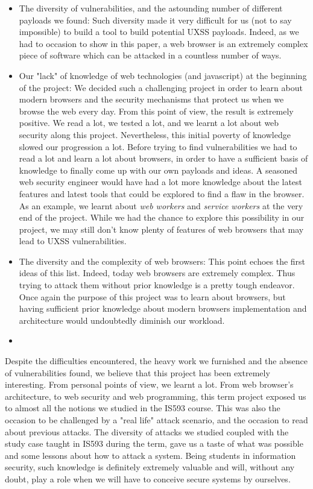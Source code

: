 \documentclass[journal]{IEEEtran}
\begin{document}
\begin{itemize}
\item The diversity of vulnerabilities, and the astounding number of different payloads we found: Such diversity made it very difficult for us (not to say impossible) to build a tool to build potential UXSS payloads. Indeed, as we had to occasion to show in this paper, a web browser is an extremely complex piece of software which can be attacked in a countless number of ways.
\item Our "lack" of knowledge of web technologies (and javascript) at the beginning of the project: We decided such a challenging project in order to learn about modern browsers and the security mechanisms that protect us when we browse the web every day. From this point of view, the result is extremely positive. We read a lot, we tested a lot, and we learnt a lot about web security along this project. Nevertheless, this initial poverty of knowledge slowed our progression a lot. Before trying to find vulnerabilities we had to read a lot and learn a lot about browsers, in order to have a sufficient basis of knowledge to finally come up with our own payloads and ideas. A seasoned web security engineer would have had a lot more knowledge about the latest features and latest tools that could be explored to find a flaw in the browser. As an example, we learnt about \emph{web workers} and \emph{service workers} at the very end of the project. While we had the chance to explore this possibility in our project, we may still don't know plenty of features of web browsers that may lead to UXSS vulnerabilities.
\item The diversity and the complexity of web browsers: This point echoes the first ideas of this list. Indeed, today web browsers are extremely complex. Thus trying to attack them without prior knowledge is a pretty tough endeavor. Once again the purpose of this project was to learn about browsers, but having sufficient prior knowledge about modern browsers implementation and architecture would undoubtedly diminish our workload.
\item
\end{itemize}

\medskip

Despite the difficulties encountered, the heavy work we furnished and the absence of vulnerabilities found, we believe that this project has been extremely interesting. From personal points of view, we learnt a lot. From web browser's architecture, to web security and web programming, this term project exposed us to almost all the notions we studied in the IS593 course. This was also the occasion to be challenged by a "real life" attack scenario, and the occasion to read about previous attacks. The diversity of attacks we studied coupled with the study case taught in IS593 during the term, gave us a taste of what was possible and some lessons about how to attack a system. Being students in information security, such knowledge is definitely extremely valuable and will, without any doubt, play a role when we will have to conceive secure systems by ourselves.
\end{document}

